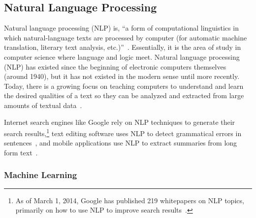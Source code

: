 \subsection{Natural Language Processing}

Natural language processing (NLP) is, ``a form of computational linguistics in which natural-language texts are processed by computer (for automatic machine translation, literary text analysis, etc.)''~\cite{oed-nlp}.
Essentially, it is the area of study in computer science where language and logic meet.
Natural language processing (NLP) has existed since the beginning of electronic computers themselves (around 1940), but it has not existed in the modern sense until more recently.
Today, there is a growing focus on teaching computers to understand and learn the desired qualities of a text so they can be analyzed and extracted from large amounts of textual data~\cite{jurafsky}.

Internet search engines like Google rely on NLP techniques to generate their search results,\footnote{As of March 1, 2014, Google has published 219 whitepapers on NLP topics, primarily on how to use NLP to improve search results~\cite{google-nlp}.} text editing software uses NLP to detect grammatical errors in sentences~\cite{norvig}, and mobile applications use NLP to extract summaries from long form text~\cite{bit-of-news}.

\subsubsection{Machine Learning}

